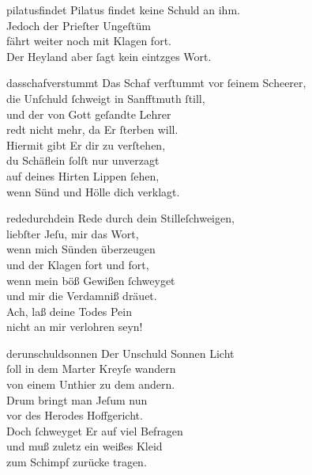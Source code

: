 \documentclass[tocstyle=ref-genre]{ees}
\begin{document}
{\begin{movement}{pilatusfindet}
  Pilatus findet keine Schuld an ihm.\\
  Jedoch der Prieſter Ungeſtüm\\
  fährt weiter noch mit Klagen fort.\\
  Der Heyland aber ſagt kein eintzges Wort.
\end{movement}

\clearpage
\begin{movement}{dasschafverstummt}
  Das Schaf verſtummt vor ſeinem Scheerer,\\
  die Unſchuld ſchweigt in Sanfftmuth ſtill,\\
  und der von Gott geſandte Lehrer\\
  redt nicht mehr, da Er ſterben will.\\
  Hiermit gibt Er dir zu verſtehen,\\
  du Schäflein ſolſt nur unverzagt\\
  auf deines Hirten Lippen ſehen,\\
  wenn Sünd und Hölle dich verklagt.
\end{movement}

\begin{movement}{rededurchdein}
  \voice[Coro]
  Rede durch dein Stilleſchweigen,\\
  liebſter Jeſu, mir das Wort,\\
  wenn mich Sünden überzeugen\\
  und der Klagen fort und fort,\\
  wenn mein böß Gewißen ſchweyget\\
  und mir die Verdamniß dräuet.\\
  Ach, laß deine Todes Pein\\
  nicht an mir verlohren seyn!
\end{movement}

\begin{movement}{derunschuldsonnen}
  Der Unschuld Sonnen Licht\\
  ſoll in dem Marter Kreyſe wandern\\
  von einem Unthier zu dem andern.\\
  Drum bringt man Jeſum nun\\
  vor des Herodes Hoffgericht.\\
  Doch ſchweyget Er auf viel Befragen\\
  und muß zuletz ein weißes Kleid\\
  zum Schimpf zurücke tragen.
\end{movement}

}
\end{document}
